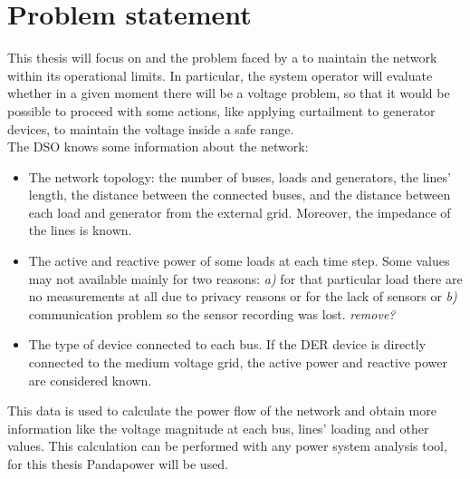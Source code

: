 \section{Problem statement}
\label{sec:ps}
This thesis will focus on  and the problem faced by a  to maintain the network within its operational limits. In particular, the system operator will evaluate whether in a given moment there will be a voltage problem, so that it would be possible to proceed with some actions, like applying curtailment to generator devices, to maintain the voltage inside a safe range.\\

The \gls{DSO} knows some information about the network:
\begin{itemize}
    \item The network topology: the number of buses, loads and generators, the lines' length, the distance between the connected buses, and the distance between each load and generator from the external grid. Moreover, the impedance of the lines is known.
    
    \item The active and reactive power of some loads at each time step. Some values may not available mainly for two reasons: \emph{a)} for that particular load there are no measurements at all due to privacy reasons or for the lack of sensors or \emph{b)} communication problem so the sensor recording was lost. \emph{remove?}
    
    \item The type of  device connected to each bus. If the \gls{DER} device is directly connected to the medium voltage grid, the active power and reactive power are considered known. 
\end{itemize}

This data is used to calculate the power flow of the network and obtain more information like the voltage magnitude at each bus, lines' loading and other values. This calculation can be performed with any power system analysis tool, for this thesis Pandapower will be used.\\


